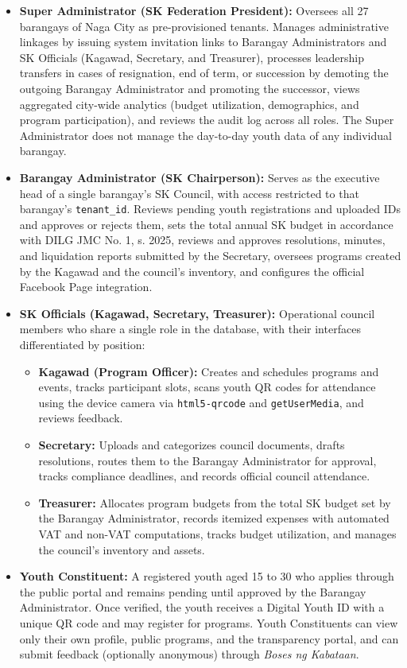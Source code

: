 \begin{itemize}
    \item \textbf{Super Administrator (SK Federation President):} Oversees all 27 barangays of Naga City as pre-provisioned tenants. Manages administrative linkages by issuing system invitation links to Barangay Administrators and SK Officials (Kagawad, Secretary, and Treasurer), processes leadership transfers in cases of resignation, end of term, or succession by demoting the outgoing Barangay Administrator and promoting the successor, views aggregated city-wide analytics (budget utilization, demographics, and program participation), and reviews the audit log across all roles. The Super Administrator does not manage the day-to-day youth data of any individual barangay.
    \item \textbf{Barangay Administrator (SK Chairperson):} Serves as the executive head of a single barangay's SK Council, with access restricted to that barangay's \texttt{tenant\_id}. Reviews pending youth registrations and uploaded IDs and approves or rejects them, sets the total annual SK budget in accordance with DILG JMC No. 1, s. 2025, reviews and approves resolutions, minutes, and liquidation reports submitted by the Secretary, oversees programs created by the Kagawad and the council's inventory, and configures the official Facebook Page integration.
    \item \textbf{SK Officials (Kagawad, Secretary, Treasurer):} Operational council members who share a single role in the database, with their interfaces differentiated by position:
    \begin{itemize}
        \item \textbf{Kagawad (Program Officer):} Creates and schedules programs and events, tracks participant slots, scans youth QR codes for attendance using the device camera via \texttt{html5-qrcode} and \texttt{getUserMedia}, and reviews feedback.
        \item \textbf{Secretary:} Uploads and categorizes council documents, drafts resolutions, routes them to the Barangay Administrator for approval, tracks compliance deadlines, and records official council attendance.
        \item \textbf{Treasurer:} Allocates program budgets from the total SK budget set by the Barangay Administrator, records itemized expenses with automated VAT and non-VAT computations, tracks budget utilization, and manages the council's inventory and assets.
    \end{itemize}
    \item \textbf{Youth Constituent:} A registered youth aged 15 to 30 who applies through the public portal and remains pending until approved by the Barangay Administrator. Once verified, the youth receives a Digital Youth ID with a unique QR code and may register for programs. Youth Constituents can view only their own profile, public programs, and the transparency portal, and can submit feedback (optionally anonymous) through \textit{Boses ng Kabataan}.

\end{itemize}
